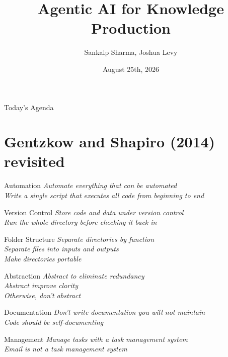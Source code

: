 \documentclass[aspectratio=1610, xcolor={dvipsnames}]{beamer}
\title{Agentic AI for Knowledge Production}
\author{Sankalp Sharma, Joshua Levy}
\institute{University of Southern California}
\date{August 25th, 2026}
\begin{document}
\begin{frame}
    \titlepage
\end{frame}
\begin{frame}{Today's Agenda}
    \tableofcontents
\end{frame}

\section{Gentzkow and Shapiro (2014) revisited}

\begin{frame}{Automation}
    \Large
    \textit{Automate everything that can be automated}\\

    \textit{Write a single script that executes all code from beginning to end}\\
\end{frame}
\begin{frame}{Version Control}
    \Large
    \textit{Store code and data under version control}\\

    \textit{Run the whole directory before checking it back in}\\
\end{frame}
\begin{frame}{Folder Structure}
    \Large
    \textit{Separate directories by function}\\

    \textit{Separate files into inputs and outputs}\\

    \textit{Make directories portable}\\
\end{frame}
\begin{frame}{Abstraction}
    \Large
    \textit{Abstract to eliminate redundancy}\\

    \textit{Abstract improve clarity}\\

    \textit{Otherwise, don't abstract}\\
\end{frame}
\begin{frame}{Documentation}
    \Large
    \textit{Don't write documentation you will not maintain}\\

    \textit{Code should be self-documenting}\\
\end{frame}
\begin{frame}{Management}
    \Large
    \textit{Manage tasks with a task management system}\\

    \textit{Email is not a task management system}\\
\end{frame}
\end{document}
